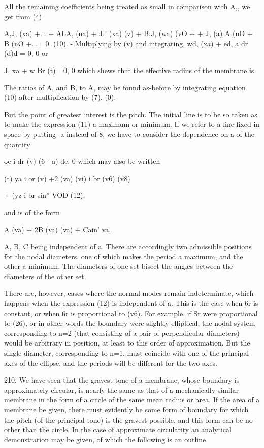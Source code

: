 All the remaining coefficients being treated as small in comparison with
A,, we get from (4)

A,J, (xa) +... + ALA, (ua) + J,' (xa) (v) + B,J, (wa) (vO + + J,
(a) A (nO + B (nO +... =0. (10). - Multiplying by (v) and
integrating, wd, (xa) + ed, a dr (d)d = 0, 0 or

J, xa + w Br (t) =0, 0
which shews that the effective radius of the membrane is

The ratios of A, and B, to A, may be found as-before by integrating
equation (10) after multiplication by (7), (0).

But the point of greatest interest is the pitch. The initial line is to
be so taken as to make the expression (11) a maximum or minimum. If we
refer to a line fixed in space by putting -a instead of 8, we have to
consider the dependence on a of the quantity

oe i dr (v) (6 - a) de, 0 which may also be written

(t) ya i or (v) +2 (va) (vi) i br (v6) (v8)

+ (yz i br sin'' VOD (12),

and is of the form

A (va) + 2B (va) (va) + Cain' va,

A, B, C being independent of a. There are accordingly two admissible
positions for the nodal diameters, one of which makes the period a
maximum, and the other a minimum. The diameters of one set bisect the
angles between the diameters of the other set.

There are, however, cases where the normal modes remain indeterminate,
which happens when the expression (12) is independent of a. This is the
case when 6r is constant, or when 6r is proportional to (v6). For
example, if Sr were proportional to (26), or in other words the boundary
were slightly elliptical, the nodal system corresponding to n=2 (that
consisting of a pair of perpendicular diameters) would be arbitrary in
position, at least to this order of approximation. But the single
diameter, corresponding to n=1, must coincide with one of the principal
axes of the ellipse, and the periods will be different for the two axes.

210. We have seen that the gravest tone of a membrane, whose boundary is
approximately circular, is nearly the same as that of a mechanically
similar membrane in the form of a circle of the same mean radius or
area. If the area of a membrane be given, there must evidently be some
form of boundary for which the pitch (of the principal tone) is the
gravest possible, and this form can be no other than the circle. In the
case of approximate circularity an analytical demonstration may be
given, of which the following is an outline.


